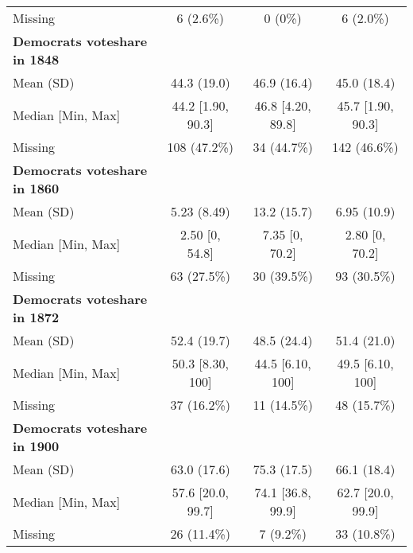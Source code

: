 \begin{table}[h]
\begin{tabular}[t]{>{}lccc}
Missing & 6 (2.6\%) & 0 (0\%) & 6 (2.0\%)\\
\addlinespace
\textbf{Democrats voteshare in 1848} &  &  & \\
Mean (SD) & 44.3 (19.0) & 46.9 (16.4) & 45.0 (18.4)\\
Median [Min, Max] & 44.2 [1.90, 90.3] & 46.8 [4.20, 89.8] & 45.7 [1.90, 90.3]\\
Missing & 108 (47.2\%) & 34 (44.7\%) & 142 (46.6\%)\\
\addlinespace
\textbf{Democrats voteshare in 1860} &  &  & \\
Mean (SD) & 5.23 (8.49) & 13.2 (15.7) & 6.95 (10.9)\\
Median [Min, Max] & 2.50 [0, 54.8] & 7.35 [0, 70.2] & 2.80 [0, 70.2]\\
Missing & 63 (27.5\%) & 30 (39.5\%) & 93 (30.5\%)\\
\addlinespace
\textbf{Democrats voteshare in 1872} &  &  & \\
Mean (SD) & 52.4 (19.7) & 48.5 (24.4) & 51.4 (21.0)\\
Median [Min, Max] & 50.3 [8.30, 100] & 44.5 [6.10, 100] & 49.5 [6.10, 100]\\
Missing & 37 (16.2\%) & 11 (14.5\%) & 48 (15.7\%)\\
\addlinespace
\textbf{Democrats voteshare in 1900} &  &  & \\
Mean (SD) & 63.0 (17.6) & 75.3 (17.5) & 66.1 (18.4)\\
Median [Min, Max] & 57.6 [20.0, 99.7] & 74.1 [36.8, 99.9] & 62.7 [20.0, 99.9]\\
Missing & 26 (11.4\%) & 7 (9.2\%) & 33 (10.8\%)\\
\bottomrule
\end{tabular}
\end{table}
